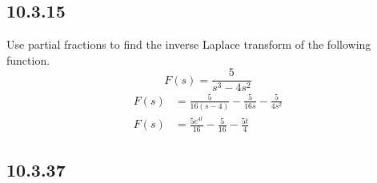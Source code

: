 \documentclass{article}
\begin{document}
\subsection{10.3.15}

Use partial fractions to find the inverse Laplace transform of the following function.
\begin{equation*}
	F(s) = \frac{5}{s^3 - 4s^2}
\end{equation*}
\begin{align*}
	F(s) & = \frac{5}{16(s - 4)} - \frac{5}{16s} - \frac{5}{4s^2} \\
	F(s) & = \frac{5e^{4t}}{16} - \frac{5}{16} - \frac{5t}{4}
\end{align*}

\subsection{10.3.37}
\end{document}
